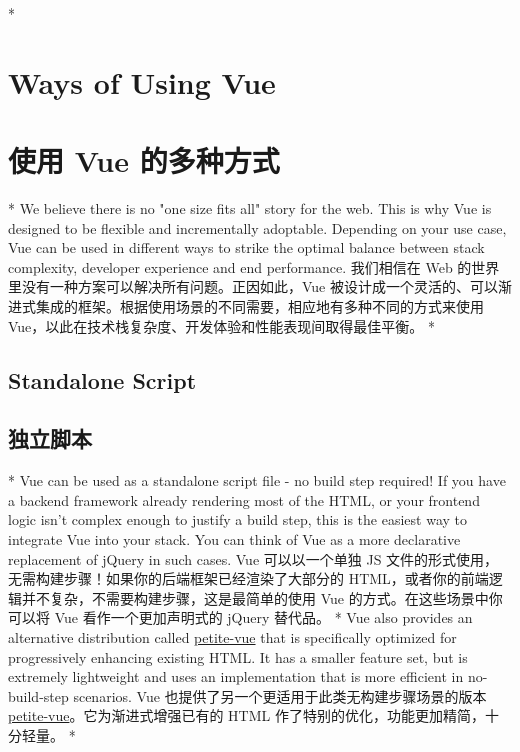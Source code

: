 
\begin{paracol}{2} 
 
\switchcolumn[0]*%
\section{Ways of Using Vue}
\switchcolumn
\section{使用 Vue 的多种方式}
\switchcolumn[0]*%
We believe there is no "one size fits all" story for the web. This is
why Vue is designed to be flexible and incrementally adoptable.
Depending on your use case, Vue can be used in different ways to strike
the optimal balance between stack complexity, developer experience and
end performance.
\switchcolumn
我们相信在 Web 的世界里没有一种方案可以解决所有问题。正因如此，Vue
被设计成一个灵活的、可以渐进式集成的框架。根据使用场景的不同需要，相应地有多种不同的方式来使用
Vue，以此在技术栈复杂度、开发体验和性能表现间取得最佳平衡。
\switchcolumn[0]*%
\subsection{Standalone Script}
\switchcolumn
\subsection{独立脚本}
\switchcolumn[0]*%
Vue can be used as a standalone script file - no build step required! If
you have a backend framework already rendering most of the HTML, or your
frontend logic isn't complex enough to justify a build step, this is the
easiest way to integrate Vue into your stack. You can think of Vue as a
more declarative replacement of jQuery in such cases.
\switchcolumn
Vue 可以以一个单独 JS
文件的形式使用，无需构建步骤！如果你的后端框架已经渲染了大部分的
HTML，或者你的前端逻辑并不复杂，不需要构建步骤，这是最简单的使用 Vue
的方式。在这些场景中你可以将 Vue 看作一个更加声明式的 jQuery 替代品。
\switchcolumn[0]*%
Vue also provides an alternative distribution called
\href{https://github.com/vuejs/petite-vue}{petite-vue} that is
specifically optimized for progressively enhancing existing HTML. It has
a smaller feature set, but is extremely lightweight and uses an
implementation that is more efficient in no-build-step scenarios.
\switchcolumn
Vue 也提供了另一个更适用于此类无构建步骤场景的版本
\href{https://github.com/vuejs/petite-vue}{petite-vue}。它为渐进式增强已有的
HTML 作了特别的优化，功能更加精简，十分轻量。
\switchcolumn[0]*%

\end{paracol}
